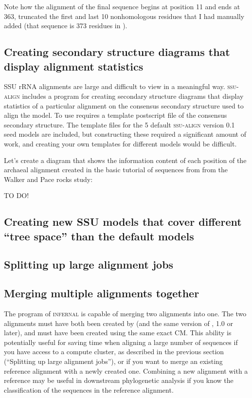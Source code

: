 Note how the alignment of the final sequence begins at position 11 and
ends at 363, truncated the first and last 10 nonhomologous residues
that I had manually added (that sequence is 373 residues in
).

\subsection{Creating secondary structure diagrams that
  display alignment statistics}

SSU rRNA alignments are large and difficult to view in a meaningful
way. \textsc{ssu-align} includes a program  for
creating secondary structure diagrams that display statistics of a
particular alignment on the consensus secondary structure used to
align the model. To use  requires a template
postscript file of the consensus secondary structure. The template
files for the 5 default \textsc{ssu-align} version 0.1 seed models are
included, but constructing these required a significant amount of
work, and creating your own templates for different models would be
difficult. 

Let's create a diagram that shows the information content of each
position of the archaeal alignment created in the basic tutorial of
sequences from from the Walker and Pace
rocks study:

TO DO!

\subsection{Creating new SSU models that cover
  different ``tree space'' than the default models}
\subsection{Splitting up large alignment jobs}
\subsection{Merging multiple alignments together}

The  program of \textsc{infernal} is capable of merging
two alignments into one. The two alignments must have both been created by
 (and the same version of , 1.0 or later),
and must have been created using the same exact CM. This ability is
potentially useful for saving time when aligning a large number of
sequences if you have access to a compute cluster, as described in the
previous section (``Splitting up large alignment jobs''), or if you
want to merge an existing reference alignment with a newly created
one. Combining a new alignment with a reference may be useful in
downstream phylogenetic analysis if you know the classification of the
sequences in the reference alignment.

